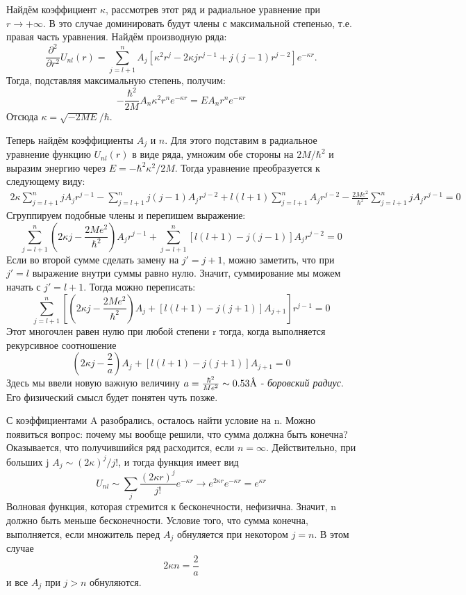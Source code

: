 Найдём коэффициент $\kappa$, рассмотрев этот ряд и радиальное уравнение при $r \rightarrow +\infty$. В это случае доминировать будут члены с максимальной степенью, т.е. правая часть уравнения. Найдём производную ряда:
\[
\frac{\partial^2}{\partial r^2} U_{nl}(r) =  \sum\limits_{j=l+1}^{n} A_j[\kappa^2r^j - 2\kappa jr^{j-1} + j(j-1)r^{j-2}]e^{-\kappa r}.
\]
Тогда, подставляя максимальную степень, получим:
\[
 -\frac{\hbar^2}{2M}A_n\kappa^2r^n e^{-\kappa r} = EA_n r^n e^{-\kappa r}
\]
Отсюда $\kappa = \sqrt{-2ME}/\hbar$.

Теперь найдём коэффициенты $A_j$ и $n$. Для этого подставим в радиальное уравнение функцию $U_{nl}(r)$ в виде ряда, умножим обе стороны на $2M/\hbar^2$ и выразим энергию через $E = -\hbar^2\kappa^2/2M$. Тогда уравнение преобразуется к следующему виду:
\begin{align*}
    2\kappa\sum\limits_{j = l+1}^n jA_j r^{j-1} - \sum\limits_{j = l+1}^n j(j-1)A_j r^{j-2} + l(l+1)\sum\limits_{j = l+1}^n A_j r^{j-2} - \frac{2Me^2}{\hbar^2}\sum\limits_{j = l+1}^n jA_j r^{j-1} =0
\end{align*}
Сгруппируем подобные члены и перепишем выражение:
\[
\sum\limits_{j = l+1}^n\left(2\kappa j - \frac{2Me^2}{\hbar^2}\right)A_j r^{j-1} + \sum\limits_{j = l+1}^n [l(l+1) - j(j-1)] A_j r^{j-2} =0
\]
Если во второй сумме сделать замену на $j' = j + 1$, можно заметить, что при $j'=l$ выражение внутри суммы равно нулю. Значит, суммирование мы можем начать с $j'= l+ 1$. Тогда можно переписать:
\[
\sum\limits_{j = l+1}^n\left[\left(2\kappa j - \frac{2Me^2}{\hbar^2}\right)A_j+ [l(l+1) - j(j+1)] A_{j+1} \right]r^{j-1} = 0
\]
Этот многочлен равен нулю при любой степени r тогда, когда выполняется рекурсивное соотношение
\[
\left(2\kappa j - \frac{2}{a}\right)A_j+ [l(l+1) - j(j+1)] A_{j+1} = 0
\]
Здесь мы ввели новую важную величину $a = \frac{\hbar^2}{Me^2} \sim 0.53 \text{\r{A}}$ - \textit{боровский радиус}. Его физический смысл будет понятен чуть позже.

С коэффициентами A разобрались, осталось найти условие на n. Можно появиться вопрос: почему мы вообще решили, что сумма должна быть конечна? Оказывается, что получившийся ряд расходится, если $n=\infty$. Действительно, при больших j $A_j \sim (2\kappa)^j/j!$, и тогда функция имеет вид
\[
U_{nl} \sim \sum\limits_j\frac{(2\kappa r)^j}{j!}e^{-\kappa r} \rightarrow e^{2\kappa r}e^{-\kappa r} = e^{\kappa r}
\]
Волновая функция, которая стремится к бесконечности, нефизична. Значит, n должно быть меньше бесконечности. Условие того, что сумма конечна, выполняется, если множитель перед $A_j$ обнуляется при некотором $j = n$. В этом случае
\[
2\kappa n = \frac{2}{a}
\]
и все $A_j$ при $j > n$ обнуляются.

